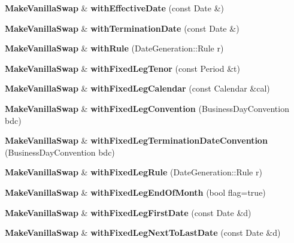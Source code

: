 \begin{DoxyCompactItemize}
\item 
{\bf Make\+Vanilla\+Swap} \& {\bfseries with\+Effective\+Date} (const Date \&)\label{class_quant_lib_1_1_make_vanilla_swap_a51daaa2c8b3af1d4a9298c2ebc65e360}

\item 
{\bf Make\+Vanilla\+Swap} \& {\bfseries with\+Termination\+Date} (const Date \&)\label{class_quant_lib_1_1_make_vanilla_swap_a5bf988c6518d9ef1ed668d77c096f42c}

\item 
{\bf Make\+Vanilla\+Swap} \& {\bfseries with\+Rule} (Date\+Generation\+::\+Rule r)\label{class_quant_lib_1_1_make_vanilla_swap_a6ccbcf1531e0181ef929c147c18a3f15}

\item 
{\bf Make\+Vanilla\+Swap} \& {\bfseries with\+Fixed\+Leg\+Tenor} (const Period \&t)\label{class_quant_lib_1_1_make_vanilla_swap_a468c63f00fc0daa0aa4b35f49e1f6ed1}

\item 
{\bf Make\+Vanilla\+Swap} \& {\bfseries with\+Fixed\+Leg\+Calendar} (const Calendar \&cal)\label{class_quant_lib_1_1_make_vanilla_swap_a271b23ec37263dcad4c8308f988efd82}

\item 
{\bf Make\+Vanilla\+Swap} \& {\bfseries with\+Fixed\+Leg\+Convention} (Business\+Day\+Convention bdc)\label{class_quant_lib_1_1_make_vanilla_swap_a992e19cb811bc2e4a47e7e2d5382aeb8}

\item 
{\bf Make\+Vanilla\+Swap} \& {\bfseries with\+Fixed\+Leg\+Termination\+Date\+Convention} (Business\+Day\+Convention bdc)\label{class_quant_lib_1_1_make_vanilla_swap_ac8feea8090ce33a15745f3329a1d8318}

\item 
{\bf Make\+Vanilla\+Swap} \& {\bfseries with\+Fixed\+Leg\+Rule} (Date\+Generation\+::\+Rule r)\label{class_quant_lib_1_1_make_vanilla_swap_a0d31723d496fdd68af9b92e063e31c27}

\item 
{\bf Make\+Vanilla\+Swap} \& {\bfseries with\+Fixed\+Leg\+End\+Of\+Month} (bool flag=true)\label{class_quant_lib_1_1_make_vanilla_swap_a43a00febb6a4489ec9905bf95ac2abb0}

\item 
{\bf Make\+Vanilla\+Swap} \& {\bfseries with\+Fixed\+Leg\+First\+Date} (const Date \&d)\label{class_quant_lib_1_1_make_vanilla_swap_a30006df67db804608c488f4cfc3163eb}

\item 
{\bf Make\+Vanilla\+Swap} \& {\bfseries with\+Fixed\+Leg\+Next\+To\+Last\+Date} (const Date \&d)\label{class_quant_lib_1_1_make_vanilla_swap_abf040cae8502b79e50f51bb3157876b8}


\end{DoxyCompactItemize}

